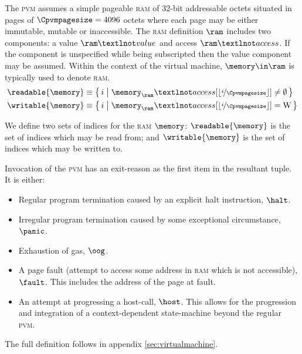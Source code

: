 The \textsc{pvm} assumes a simple pageable \textsc{ram} of 32-bit addressable octets situated in pages of $\Cpvmpagesize = 4096$ octets where each page may be either immutable, mutable or inaccessible. The \textsc{ram} definition $\ram$ includes two components: a value $\ram¬value$ and access $\ram¬access$. If the component is unspecified while being subscripted then the value component may be assumed. Within the context of the virtual machine, $\memory \in \ram$ is typically used to denote \textsc{ram}.
\begin{align}
  \readable{\memory} &\equiv \set{\build{i}{\memory_\ram¬access\subb{\floor{\nicefrac{i}{\Cpvmpagesize}}} \ne \none}} \\
  \writable{\memory} &\equiv \set{\build{i}{\memory_\ram¬access\subb{\floor{\nicefrac{i}{\Cpvmpagesize}}} = \text{W} }}
\end{align}

We define two sets of indices for the \textsc{ram} $\memory$: $\readable{\memory}$ is the set of indices which may be read from; and $\writable{\memory}$ is the set of indices which may be written to.

Invocation of the \textsc{pvm} has an exit-reason as the first item in the resultant tuple. It is either:
\begin{itemize}
  \item Regular program termination caused by an explicit halt instruction, $\halt$.
  \item Irregular program termination caused by some exceptional circumstance, $\panic$.
  \item Exhaustion of gas, $\oog$.
  \item A page fault (attempt to access some address in \textsc{ram} which is not accessible), $\fault$. This includes the address of the page at fault.
  \item An attempt at progressing a host-call, $\host$. This allows for the progression and integration of a context-dependent state-machine beyond the regular \textsc{pvm}.
\end{itemize}

The full definition follows in appendix \ref{sec:virtualmachine}.

















